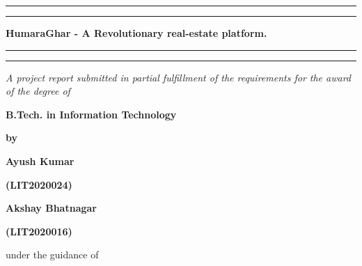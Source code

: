 \thispagestyle{empty}

\setcounter{page}{1}

\def\thepage{\roman{page}}

\begin{center}

    \rule[0.5ex]{\linewidth}{2pt}\vspace*{-\baselineskip}\vspace*{3.2pt}
    \rule[0.5ex]{\linewidth}{2pt}

    \vspace*{3.2pt}

    {\Large\bf HumaraGhar - A Revolutionary real-estate platform.}

    \vspace*{3.2pt}

    \rule[0.5ex]{\linewidth}{2pt}\vspace*{-\baselineskip}\vspace*{3.2pt}
    \rule[0.5ex]{\linewidth}{2pt}

    \vspace{1.5cm}

    \textit{{A project report submitted in partial fulfillment of the requirements
                for the award of the degree of}}

    \vspace{1cm}

    {\bf B.Tech. in Information Technology}

    \vspace{0.5cm}

    {\bf by}

    \vspace{0.5cm}

    {\bf {Ayush Kumar}}

    \vspace{0.1cm}

    {\bf {(LIT2020024)}}

    \vspace{0.2cm}

    {\bf {Akshay Bhatnagar}}

    \vspace{0.1cm}

    {\bf {(LIT2020016)}}

    \vspace{1.1cm}

    {under the guidance of}

    \vspace{0.1cm}


\end{center}
